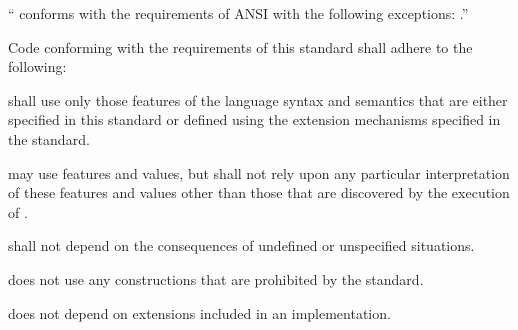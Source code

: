 \beginlist
\item{} `` conforms with the requirements of
	  ANSI  with the following exceptions: 
	  .''
\endlist 
 
\endsubsubsection%

\endsubSection%


Code conforming with the requirements of this standard shall adhere to the
following:

\beginlist
   shall use only those features of the
               language syntax and semantics that are 
	       either specified in this standard
		   or defined using the extension mechanisms 
		      specified in the standard.
 

  may use
	       features and values, 
	      but shall not rely upon
	      any particular interpretation of these features and values 
	      other than those that are discovered by the execution of .

  shall not depend on the consequences
	      of undefined or unspecified situations.

  does not use any constructions 
	      that are prohibited by the standard.

  does not depend on extensions 
	      included in an implementation.
\endlist 

